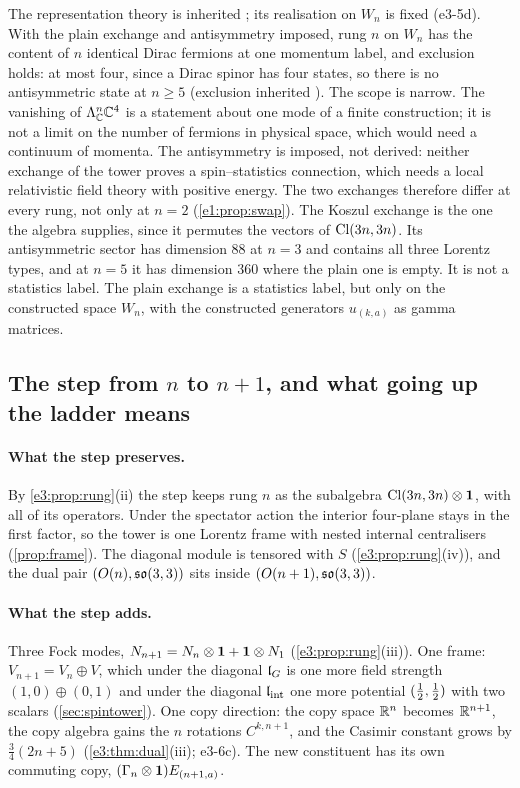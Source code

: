 The representation theory is inherited \cite{WeinbergQFT}; its realisation on $W_n$ is fixed (e3-5d). With the plain exchange and
antisymmetry imposed, rung $n$ on $W_n$ has the content of $n$ identical Dirac fermions at one momentum label, and exclusion holds: at most
four, since a Dirac spinor has four states, so there is no antisymmetric state at $n\ge5$ (exclusion inherited \cite{Pauli40}). The scope is
narrow. The vanishing of $\Lambda^n_{\mathbb{C}}\mathbb{C}^4$ is a statement about one mode of a finite construction; it is not a limit on the number of fermions in
physical space, which would need a continuum of momenta. The antisymmetry is imposed, not derived: neither exchange of the tower proves a
spin--statistics connection, which needs a local relativistic field theory with positive energy. The two exchanges therefore differ at
every rung, not only at $n=2$ (\cref{e1:prop:swap}). The Koszul exchange is the one the algebra supplies, since it permutes the vectors of
$\mathrm{Cl}(3n,3n)$. Its antisymmetric sector has dimension $88$ at $n=3$ and contains all three Lorentz types, and at $n=5$ it has dimension $360$
where the plain one is empty. It is not a statistics label. The plain exchange is a statistics label, but only on the constructed space $W_n$,
with the constructed generators $u_{(k,a)}$ as gamma matrices.

\subsection{The step from \texorpdfstring{$n$}{n} to \texorpdfstring{$n+1$}{n+1}, and what going up the ladder means}
\label{e3:sec:answer}

\paragraph{What the step preserves.} By \cref{e3:prop:rung}(ii) the step keeps rung $n$ as the subalgebra $\mathrm{Cl}(3n,3n)\otimes\mathbf 1$, with all of its
operators. Under the spectator action the interior four-plane stays in the first factor, so the tower is one Lorentz frame with nested
internal centralisers (\cref{prop:frame}). The diagonal module is tensored with $S$ (\cref{e3:prop:rung}(iv)), and the dual pair $(O(n),\mathfrak{so}(3,3))$ sits inside
$(O(n+1),\mathfrak{so}(3,3))$.

\paragraph{What the step adds.} Three Fock modes, $N_{n+1}=N_n\otimes\mathbf 1+\mathbf 1\otimes N_1$ (\cref{e3:prop:rung}(iii)). One frame: $V_{n+1}=V_n\oplus V$, which
under the diagonal $\mathfrak l_G$ is one more field strength $(1,0)\oplus(0,1)$ and under the diagonal $\mathfrak l_{\rm int}$ one more potential $(\tfrac12,\tfrac12)$ with two
scalars (\cref{sec:spintower}). One copy direction: the copy space $\mathbb{R}^n$ becomes $\mathbb{R}^{n+1}$, the copy algebra gains the $n$ rotations
$C^{k,n+1}$, and the Casimir constant grows by $\tfrac34(2n+5)$ (\cref{e3:thm:dual}(iii); e3-6c). The new constituent has its own commuting
copy, $(\Gamma_n\otimes\mathbf 1)E_{(n+1,a)}$.

